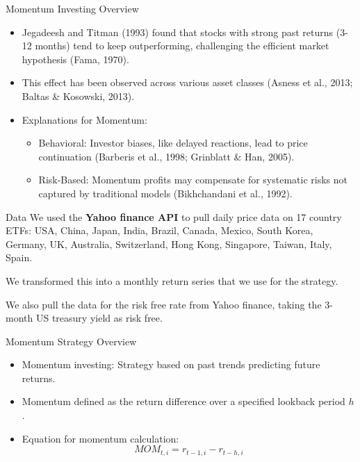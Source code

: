 \documentclass{beamer}
\newcommand{\myitem}{\item[\triangleright]}
\begin{document}
\begin{frame}[t]{Momentum Investing Overview}
    \begin{itemize}
        \myitem Jegadeesh and Titman (1993) found that stocks with strong past returns (3-12 months) tend to keep outperforming, challenging the efficient market hypothesis (Fama, 1970).
        \myitem This effect has been observed across various asset classes (Asness et al., 2013; Baltas \& Kosowski, 2013).
        \myitem Explanations for Momentum:
        \begin{itemize}
            \item Behavioral: Investor biases, like delayed reactions, lead to price continuation (Barberis et al., 1998; Grinblatt \& Han, 2005).
            \item Risk-Based: Momentum profits may compensate for systematic risks not captured by traditional models (Bikhchandani et al., 1992).
        \end{itemize}
    \end{itemize}
\end{frame}


\begin{frame}[t]{Data}
We used the \textbf{Yahoo finance API} to pull daily price data on 17 country ETFs: USA, China, Japan, India, Brazil, Canada, Mexico, South Korea, Germany, UK, Australia, Switzerland, Hong Kong, Singapore, Taiwan, Italy, Spain. 

We transformed this into a monthly return series that we use for the strategy.

We also pull the data for the risk free rate from Yahoo finance, taking the 3-month US treasury yield as risk free.
\end{frame}

\begin{frame}[t]{Momentum Strategy Overview}
    \begin{itemize}
        \item Momentum investing: Strategy based on past trends predicting future returns.
        \item Momentum defined as the return difference over a specified lookback period $h$.
        \item Equation for momentum calculation:
        \begin{equation}
            MOM_{t,i} = r_{t-1,i} - r_{t-h,i}
        \end{equation}
    \end{itemize}
\end{frame}
\end{document}
